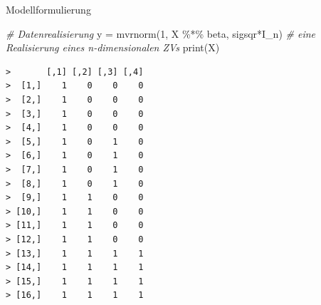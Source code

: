 \documentclass[
  8pt,
  ignorenonframetext,
]{beamer}
\newenvironment{Shaded}{\begin{snugshade}}{\end{snugshade}}
\newcommand{\CommentTok}[1]{\textcolor[rgb]{0.56,0.35,0.01}{\textit{#1}}}
\newcommand{\DecValTok}[1]{\textcolor[rgb]{0.00,0.00,0.81}{#1}}
\newcommand{\FunctionTok}[1]{\textcolor[rgb]{0.00,0.00,0.00}{#1}}
\newcommand{\NormalTok}[1]{#1}
\newcommand{\OtherTok}[1]{\textcolor[rgb]{0.56,0.35,0.01}{#1}}
\newcommand{\SpecialCharTok}[1]{\textcolor[rgb]{0.00,0.00,0.00}{#1}}
\begin{document}
\begin{frame}[fragile]{Modellformulierung}
\begin{Shaded}
\begin{Highlighting}[]
\CommentTok{\# Datenrealisierung}
\NormalTok{y      }\OtherTok{=} \FunctionTok{mvrnorm}\NormalTok{(}\DecValTok{1}\NormalTok{, X }\SpecialCharTok{\%*\%}\NormalTok{ beta, sigsqr}\SpecialCharTok{*}\NormalTok{I\_n) }\CommentTok{\# eine Realisierung eines n{-}dimensionalen ZVs}
\FunctionTok{print}\NormalTok{(X)}
\end{Highlighting}
\end{Shaded}

\begin{verbatim}
>       [,1] [,2] [,3] [,4]
>  [1,]    1    0    0    0
>  [2,]    1    0    0    0
>  [3,]    1    0    0    0
>  [4,]    1    0    0    0
>  [5,]    1    0    1    0
>  [6,]    1    0    1    0
>  [7,]    1    0    1    0
>  [8,]    1    0    1    0
>  [9,]    1    1    0    0
> [10,]    1    1    0    0
> [11,]    1    1    0    0
> [12,]    1    1    0    0
> [13,]    1    1    1    1
> [14,]    1    1    1    1
> [15,]    1    1    1    1
> [16,]    1    1    1    1
\end{verbatim}
\end{frame}
\end{document}
